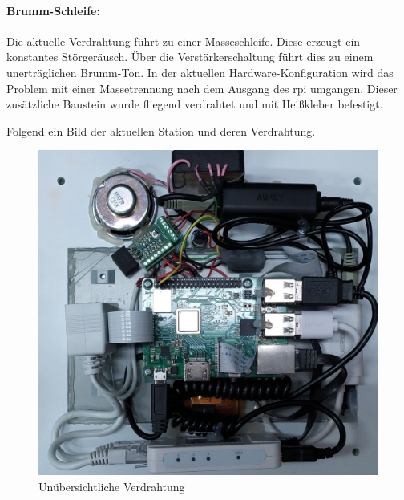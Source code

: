 \paragraph{Brumm-Schleife:} %
Die aktuelle Verdrahtung führt zu einer Masseschleife.
Diese erzeugt ein konstantes Störgeräusch.
Über die Verstärkerschaltung führt dies zu einem unerträglichen Brumm-Ton.
In der aktuellen Hardware-Konfiguration wird das Problem mit einer Massetrennung nach dem Ausgang des \ac{rpi} umgangen.
Dieser zusätzliche Baustein wurde fliegend verdrahtet und mit Heißkleber befestigt.

Folgend ein Bild der aktuellen Station und deren Verdrahtung.
\begin{figure}[H]
    \centering
    \includegraphics[width=.9\linewidth]{images/ist_situation/fliegender_aufbau.pdf}
    \caption{Unübersichtliche Verdrahtung}
\end{figure}